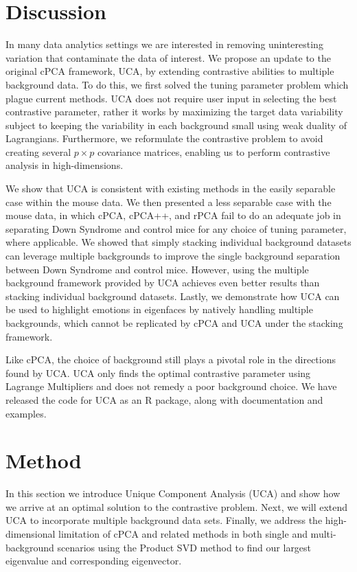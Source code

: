 \documentclass[12pt]{article}
\begin{document}
\section{Discussion}
In many data analytics settings we are interested in removing uninteresting variation that contaminate the data of interest.
We propose an update to the original cPCA framework, UCA, by extending contrastive abilities to multiple background data. To do this, we first solved the tuning parameter problem which plague current methods. UCA does not require user input in selecting the best contrastive parameter, rather it works by maximizing the target data variability subject to keeping the variability in each background small using weak duality of Lagrangians. Furthermore, we reformulate the contrastive problem to avoid creating several $p \times p$ covariance matrices, enabling us to perform contrastive analysis in high-dimensions.

We show that UCA is consistent with existing methods in the easily separable case within the mouse data. We then presented a less separable case with the mouse data, in which cPCA, cPCA++, and rPCA fail to do an adequate job in separating Down Syndrome and control mice for any choice of tuning parameter, where applicable.
We showed that simply stacking individual background datasets can leverage multiple backgrounds to improve the single background separation between Down Syndrome and control mice.
However, using the multiple background framework provided by UCA achieves even better results than stacking individual background datasets. 
Lastly, we demonstrate how UCA can be used to highlight emotions in eigenfaces by natively handling multiple backgrounds, which cannot be replicated by cPCA and UCA under the stacking framework. 

Like cPCA, the choice of background still plays a pivotal role in the directions found by UCA. UCA only finds the optimal contrastive parameter using Lagrange Multipliers and does not remedy a poor background choice.
We have released the code for UCA as an R package, along with documentation and examples.



\section{Method}
In this section we introduce Unique Component Analysis (UCA) and show how we arrive at an optimal solution to the contrastive problem. Next, we will extend UCA
to incorporate multiple background data sets. Finally, we address the high-dimensional limitation of cPCA and related methods in both single and multi-background scenarios using the Product SVD method to find our largest eigenvalue and corresponding eigenvector.  
\end{document}
